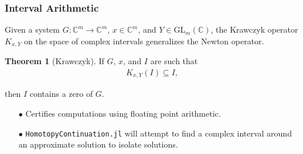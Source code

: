 \documentclass{beamer}
\theoremstyle{definition}
\newtheorem{thm}{Theorem}
\begin{document}
\begin{frame}
\frametitle{Interval Arithmetic}
Given a system $G:\mathbb{C}^m\to\mathbb{C}^m$, $x\in\mathbb{C}^m$, and $Y\in\text{GL}_m(\mathbb{C})$, the Krawczyk operator $K_{x,Y}$ on the space of complex intervals generalizes the Newton operator.

\begin{thm}[Krawczyk]
\vspace{-.1cm}
If $G$, $x$, and $I$ are such that 
\vspace{-.3cm}
\begin{align*}
K_{x,Y}(I)\subseteq I,
\end{align*}
\vspace{-.85cm} 

then $I$ contains a zero of $G$.
\end{thm}

\begin{enumerate}
\item[$\bullet$] Certifies computations using floating point arithmetic.

\item[$\bullet$] \texttt{HomotopyContinuation.jl} will attempt to find a complex interval around an approximate solution to isolate solutions.
\end{enumerate}
\end{frame}
\end{document}
